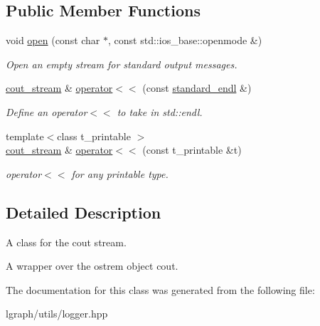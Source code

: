 \subsection*{Public Member Functions}
\begin{DoxyCompactItemize}
\item 
\mbox{\label{classlgraph_1_1utils_1_1cout__stream_a818a63700e577a13db63088353ce4098}} 
void \hyperlink{classlgraph_1_1utils_1_1cout__stream_a818a63700e577a13db63088353ce4098}{open} (const char $\ast$, const std\+::ios\+\_\+base\+::openmode \&)
\begin{DoxyCompactList}\small\item\em Open an empty stream for standard output messages. \end{DoxyCompactList}\item 
\mbox{\label{classlgraph_1_1utils_1_1cout__stream_a6e35f97a622bccec72247d6f9e6ca2c8}} 
\hyperlink{classlgraph_1_1utils_1_1cout__stream}{cout\+\_\+stream} \& \hyperlink{classlgraph_1_1utils_1_1cout__stream_a6e35f97a622bccec72247d6f9e6ca2c8}{operator$<$$<$} (const \hyperlink{classlgraph_1_1utils_1_1cout__stream_a3dc3129e1e5c26c370223e29dbdefe75}{standard\+\_\+endl} \&)
\begin{DoxyCompactList}\small\item\em Define an operator$<$$<$ to take in std\+::endl. \end{DoxyCompactList}\item 
\mbox{\label{classlgraph_1_1utils_1_1cout__stream_a88f6cf6d54312f795ccbff57724d51e4}} 
{\footnotesize template$<$class t\+\_\+printable $>$ }\\\hyperlink{classlgraph_1_1utils_1_1cout__stream}{cout\+\_\+stream} \& \hyperlink{classlgraph_1_1utils_1_1cout__stream_a88f6cf6d54312f795ccbff57724d51e4}{operator$<$$<$} (const t\+\_\+printable \&t)
\begin{DoxyCompactList}\small\item\em operator$<$$<$ for any printable type. \end{DoxyCompactList}\end{DoxyCompactItemize}


\subsection{Detailed Description}
A class for the cout stream. 

A wrapper over the ostrem object cout. 

The documentation for this class was generated from the following file\+:\begin{DoxyCompactItemize}
\item 
lgraph/utils/logger.\+hpp\end{DoxyCompactItemize}
